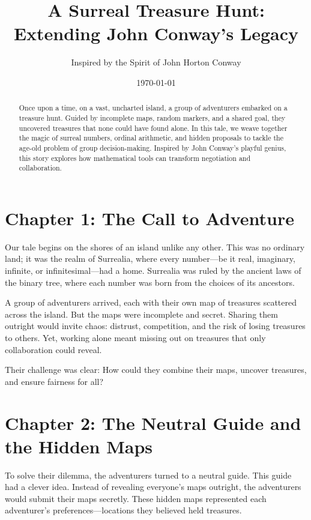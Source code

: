 \documentclass[12pt]{article}
\title{A Surreal Treasure Hunt: Extending John Conway's Legacy}
\author{Inspired by the Spirit of John Horton Conway}
\date{\today}
\begin{document}
\maketitle

\begin{abstract}
Once upon a time, on a vast, uncharted island, a group of adventurers embarked on a treasure hunt. Guided by incomplete maps, random markers, and a shared goal, they uncovered treasures that none could have found alone. In this tale, we weave together the magic of surreal numbers, ordinal arithmetic, and hidden proposals to tackle the age-old problem of group decision-making. Inspired by John Conway's playful genius, this story explores how mathematical tools can transform negotiation and collaboration.
\end{abstract}

\section*{Chapter 1: The Call to Adventure}

Our tale begins on the shores of an island unlike any other. This was no ordinary land; it was the realm of Surrealia, where every number—be it real, imaginary, infinite, or infinitesimal—had a home. Surrealia was ruled by the ancient laws of the binary tree, where each number was born from the choices of its ancestors.

A group of adventurers arrived, each with their own map of treasures scattered across the island. But the maps were incomplete and secret. Sharing them outright would invite chaos: distrust, competition, and the risk of losing treasures to others. Yet, working alone meant missing out on treasures that only collaboration could reveal.

Their challenge was clear: How could they combine their maps, uncover treasures, and ensure fairness for all?

\section*{Chapter 2: The Neutral Guide and the Hidden Maps}

To solve their dilemma, the adventurers turned to a neutral guide. This guide had a clever idea. Instead of revealing everyone’s maps outright, the adventurers would submit their maps secretly. These hidden maps represented each adventurer’s preferences—locations they believed held treasures.
\end{document}
